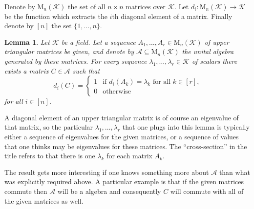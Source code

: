 \documentclass[12pt]{article}
\newtheorem*{lemma}{Lemma}
\newcommand{\mc}{\mathcal}
\newcommand{\Mat}{\mathrm{M}}
\begin{document}
Denote by $\Mat_n(\mc{K})$ the set of all $n \times n$ matrices over 
$\mc{K}$. Let \(d_i\colon \Mat_n(\mc{K}) \longrightarrow \mc{K}\) be 
the function which extracts the $i$th diagonal element of a matrix. 
Finally denote by $[n]$ the set $\{1,\dotsc,n\}$. 


\begin{lemma}
  Let $\mc{K}$ be a field. 
  Let a sequence \(A_1,\dotsc,A_r \in \Mat_n(\mc{K})\) of upper 
  triangular matrices be given, and denote by \(\mc{A} \subseteq 
  \Mat_n(\mc{K})\) the unital algebra generated by these matrices. 
  For every sequence \(\lambda_1,\dotsc,\lambda_r \in \mc{K}\) of 
  scalars there exists a matrix \(C \in \mc{A}\) such that
  $$
    d_i(C) = \begin{cases}
      1& \text{if \(d_i(A_k)=\lambda_k\) for all \(k \in [r]\),}\\
      0& \text{otherwise}
    \end{cases}
  $$
  for all \(i \in [n]\).
\end{lemma}

A diagonal element of an upper triangular matrix is of course an 
eigenvalue of that matrix, so the particular $\lambda_1,\dotsc,\lambda_r$ 
that one plugs into this lemma is typically either a sequence of 
eigenvalues for the given matrices, or a sequence of values that 
one thinks may be eigenvalues for these matrices. 
The ``cross-section'' in the title refers to that there is one 
$\lambda_k$ for each matrix $A_k$.

The result gets more interesting if one knows something more about 
$\mc{A}$ than what was explicitly required above. A particular example 
is that if the given matrices commute then $\mc{A}$ will be a 
 algebra and consequently 
$C$ will commute with all of the given matrices as well.

\end{document}
